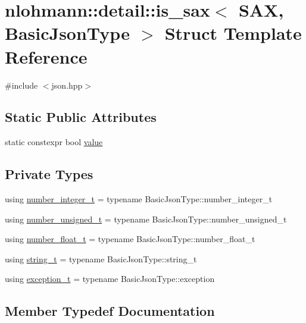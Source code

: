 \hypertarget{structnlohmann_1_1detail_1_1is__sax}{}\section{nlohmann\+::detail\+::is\+\_\+sax$<$ S\+AX, Basic\+Json\+Type $>$ Struct Template Reference}
\label{structnlohmann_1_1detail_1_1is__sax}


{\ttfamily \#include $<$json.\+hpp$>$}

\subsection*{Static Public Attributes}
\begin{DoxyCompactItemize}
\item 
static constexpr bool \mbox{\hyperlink{structnlohmann_1_1detail_1_1is__sax_a8ab7e51087000e948b4a2492257484dc}{value}}
\end{DoxyCompactItemize}
\subsection*{Private Types}
\begin{DoxyCompactItemize}
\item 
using \mbox{\hyperlink{structnlohmann_1_1detail_1_1is__sax_aa9a29390ca9810cee149510f586f5573}{number\+\_\+integer\+\_\+t}} = typename Basic\+Json\+Type\+::number\+\_\+integer\+\_\+t
\item 
using \mbox{\hyperlink{structnlohmann_1_1detail_1_1is__sax_a655c9b8038e51e5b9211e2419118644d}{number\+\_\+unsigned\+\_\+t}} = typename Basic\+Json\+Type\+::number\+\_\+unsigned\+\_\+t
\item 
using \mbox{\hyperlink{structnlohmann_1_1detail_1_1is__sax_a58d3205c8d3c7a01cc330374fa7976c5}{number\+\_\+float\+\_\+t}} = typename Basic\+Json\+Type\+::number\+\_\+float\+\_\+t
\item 
using \mbox{\hyperlink{structnlohmann_1_1detail_1_1is__sax_ad8e2e1427ff43536370b6db6ab83ae50}{string\+\_\+t}} = typename Basic\+Json\+Type\+::string\+\_\+t
\item 
using \mbox{\hyperlink{structnlohmann_1_1detail_1_1is__sax_a6efa516f35d544cc8ce9a954f849fed1}{exception\+\_\+t}} = typename Basic\+Json\+Type\+::exception
\end{DoxyCompactItemize}


\subsection{Member Typedef Documentation}
\mbox{\label{structnlohmann_1_1detail_1_1is__sax_a6efa516f35d544cc8ce9a954f849fed1}} 
